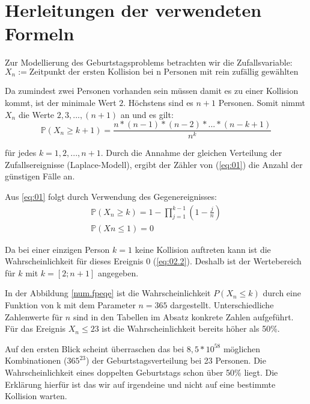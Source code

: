 \documentclass[../main.tex]{subfiles}
\begin{document}
\section{Herleitungen der verwendeten Formeln}
\begin{flushleft}
Zur Modellierung des Geburtstagsproblems betrachten wir die Zufallsvariable:
    \begin{equation}
      X_{ n } := \text{Zeitpunkt der ersten Kollision bei n Personen mit rein zufällig gewählten Geburtstagen} \label {first}
    \end{equation}


Da zumindest zwei Personen vorhanden sein müssen damit es zu einer Kollision kommt, ist der minimale Wert $2$. Höchstens sind es $n + 1$ Personen. Somit nimmt $X_{ n }$ die Werte $2,3,... ,(n+1)$ an und es gilt:
   \begin{equation}  \label{eq:01}
   \mathbb{P}(X_{ n } \geq k + 1)  = \frac{ n * (n - 1) * (n - 2) * ...* (n - k + 1) }{ n^k }
    \end{equation}

für jedes $k = 1,2,...,n + 1$. Durch die Annahme der gleichen Verteilung der Zufallsereignisse (Laplace-Modell), ergibt der Zähler von (\ref{eq:01}) die Anzahl der günstigen Fälle an. \newline

Aus \ref{eq:01} folgt durch Verwendung des Gegenereignisses:
\begin{eqnarray}
\mathbb{P}(X_{ n } \geq k) = 1 - \prod_{ j=1 }^{k-1}{ (1 - \frac{ j }{ n }) }  \label{eq:02.1} \\
\mathbb{P}(Xn\leq 1) = 0  \label{eq:02.2}
\end{eqnarray}

Da bei einer einzigen Person $k = 1$ keine Kollision auftreten kann ist die Wahrscheinlichkeit für dieses Ereignis 0 (\ref{eq:02.2}). Deshalb ist der Wertebereich für $k$ mit $k = [2;n+1]$ angegeben. \newline

In der Abbildung \ref{num.fpeqe} ist die Wahrscheinlichkeit $P(X_{n} \leq k)$ durch eine Funktion von k mit dem Parameter $n = 365$ dargestellt. Unterschiedliche Zahlenwerte für $n$ sind in den Tabellen im Absatz konkrete Zahlen aufgeführt. Für das Ereignis $ X_{n} \leq 23 $ ist die Wahrscheinlichkeit bereits höher als 50\%. \newline

Auf den ersten Blick scheint überraschen das bei $8,5 * 10^{58}$ möglichen Kombinationen ($365^{23}$) der Geburtstagsverteilung bei 23 Personen. Die Wahrscheinlichkeit eines doppelten Geburtstags schon über 50\% liegt.
Die Erklärung hierfür ist das wir auf irgendeine und nicht auf eine bestimmte Kollision warten. 



\end{flushleft}
\end{document}
